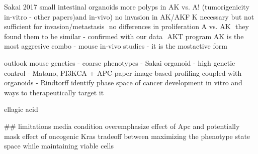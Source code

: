 Sakai 2017
small intestinal organoids more polyps in AK vs. A! (tumorigenicity in-vitro - other papers)and in-vivo) no invasion in AK/AKF K necessary but not sufficient for invasion/metastasis  no differences in proliferation A vs. AK  they found them to be similar - confirmed with our data  AKT program AK is the most aggresive combo - mouse in-vivo studies - it is the mostactive form

outlook 
mouse genetics - coarse phenotypes  - Sakai
organoid - high genetic control - Matano, PI3KCA + APC paper
image based profiling coupled with organoids - Rindtorff
identify phase space of cancer development in vitro and ways to therapeutically target it

ellagic acid

## limitations
media condition overemphasize effect of Apc and potentially mask effect of oncogenic Kras
tradeoff between maximizing the phenotype state space while maintaining viable cells 





